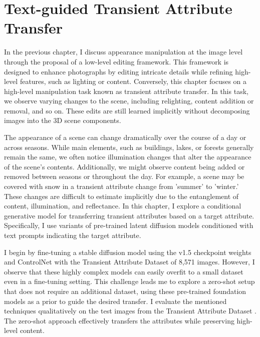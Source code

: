 \chapter{Text-guided Transient Attribute Transfer}\label{zero-shot}

In the previous chapter, I discuss appearance manipulation at the image level through the proposal of a low-level editing framework. This framework is designed to enhance photographs by editing intricate details while refining high-level features, such as lighting or content. Conversely, this chapter focuses on a high-level manipulation task known as transient attribute transfer. In this task, we observe varying changes to the scene, including relighting, content addition or removal, and so on. These edits are still learned implicitly without decomposing images into the 3D scene components.

The appearance of a scene can change dramatically over the course of a day or across seasons. While main elements, such as buildings, lakes, or forests generally remain the same, we often notice illumination changes that alter the appearance of the scene’s contents. Additionally, we might observe content being added or removed between seasons or throughout the day. For example, a scene may be covered with snow in a transient attribute change from 'summer' to 'winter.' These changes are difficult to estimate implicitly due to the entanglement of content, illumination, and reflectance. In this chapter, I explore a conditional generative model for transferring transient attributes based on a target attribute. Specifically, I use variants of pre-trained latent diffusion models conditioned with text prompts indicating the target attribute.

I begin by fine-tuning a stable diffusion model using the v1.5 checkpoint weights \cite{rombach2022high} and ControlNet \cite{zhang2023adding} with the Transient Attribute Dataset \cite{laffont2014transient} of 8,571 images. However, I observe that these highly complex models can easily overfit to a small dataset even in a fine-tuning setting. This challenge leads me to explore a zero-shot setup that does not require an additional dataset, using these pre-trained foundation models as a prior to guide the desired transfer. I evaluate the mentioned techniques qualitatively on the test images from the Transient Attribute Dataset\cite{laffont2014transient} . The zero-shot approach effectively transfers the attributes while preserving high-level content.



